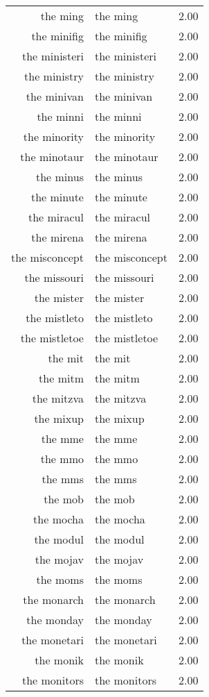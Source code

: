 \begin{table}[ht]
\begin{tabular}{rlr}
  the ming & the ming & 2.00 \\ 
  the minifig & the minifig & 2.00 \\ 
  the ministeri & the ministeri & 2.00 \\ 
  the ministry & the ministry & 2.00 \\ 
  the minivan & the minivan & 2.00 \\ 
  the minni & the minni & 2.00 \\ 
  the minority & the minority & 2.00 \\ 
  the minotaur & the minotaur & 2.00 \\ 
  the minus & the minus & 2.00 \\ 
  the minute & the minute & 2.00 \\ 
  the miracul & the miracul & 2.00 \\ 
  the mirena & the mirena & 2.00 \\ 
  the misconcept & the misconcept & 2.00 \\ 
  the missouri & the missouri & 2.00 \\ 
  the mister & the mister & 2.00 \\ 
  the mistleto & the mistleto & 2.00 \\ 
  the mistletoe & the mistletoe & 2.00 \\ 
  the mit & the mit & 2.00 \\ 
  the mitm & the mitm & 2.00 \\ 
  the mitzva & the mitzva & 2.00 \\ 
  the mixup & the mixup & 2.00 \\ 
  the mme & the mme & 2.00 \\ 
  the mmo & the mmo & 2.00 \\ 
  the mms & the mms & 2.00 \\ 
  the mob & the mob & 2.00 \\ 
  the mocha & the mocha & 2.00 \\ 
  the modul & the modul & 2.00 \\ 
  the mojav & the mojav & 2.00 \\ 
  the moms & the moms & 2.00 \\ 
  the monarch & the monarch & 2.00 \\ 
  the monday & the monday & 2.00 \\ 
  the monetari & the monetari & 2.00 \\ 
  the monik & the monik & 2.00 \\ 
  the monitors & the monitors & 2.00 \\ 

\end{tabular}
\end{table}
